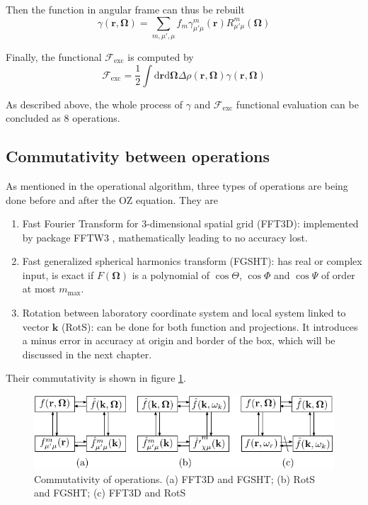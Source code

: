 Then the function in angular frame can thus be rebuilt
\begin{equation}
\gamma(\mathbf{r},\mathbf{\Omega})=\sum_{m,\mu',\mu}f_{m}\gamma_{\mu'\mu}^{m}(\mathbf{r})R_{\mu'\mu}^{m}(\mathbf{\Omega})\label{eq:fgsht-bwd}
\end{equation}

Finally, the functional $\mathcal{F}_{\mathrm{exc}}$ is computed
by
\begin{equation}
\mathcal{F}_{\mathrm{exc}}=\frac{1}{2}\int\mathrm{d}\mathbf{r}\mathrm{d}\mathbf{\Omega}\Delta\rho(\mathbf{r},\mathbf{\Omega})\gamma(\mathbf{r},\mathbf{\Omega})
\end{equation}

As described above, the whole process of $\gamma$ and $\mathcal{F}_{\mathrm{exc}}$
functional evaluation can be concluded as 8 operations.

\subsection{Commutativity between operations\label{subsec:Commutativity-between-operations}}

As mentioned in the operational algorithm, three types of operations
are being done before and after the \acs{OZ} equation. They are
\begin{enumerate}
\item Fast Fourier Transform for 3-dimensional spatial grid (FFT3D): implemented
by package FFTW3 \citep{FFTW3}, mathematically leading to no accuracy
lost.
\item Fast generalized spherical harmonics transform (\acs{FGSHT}): has
real or complex input, is exact if $F(\mathbf{\Omega})$ is a polynomial
of $\cos\Theta$, $\cos\Phi$ and $\cos\Psi$ of order at most $m_{\mathrm{max}}$.
\item Rotation between laboratory coordinate system and local system linked
to vector $\mathbf{k}$ (RotS): can be done for both function and
projections. It introduces a minus error in accuracy at origin and
border of the box, which will be discussed in the next chapter.
\end{enumerate}
Their commutativity is shown in figure \ref{fig:Commutativity-of-operations}.

\begin{figure}[h]
\begin{centering}
\includegraphics{_figure/algorithms_commutativity}
\par\end{centering}
\caption[Commutativity of operations]{Commutativity of operations. (a) FFT3D and FGSHT; (b) RotS and FGSHT;
(c) FFT3D and RotS\label{fig:Commutativity-of-operations}}
\end{figure}


